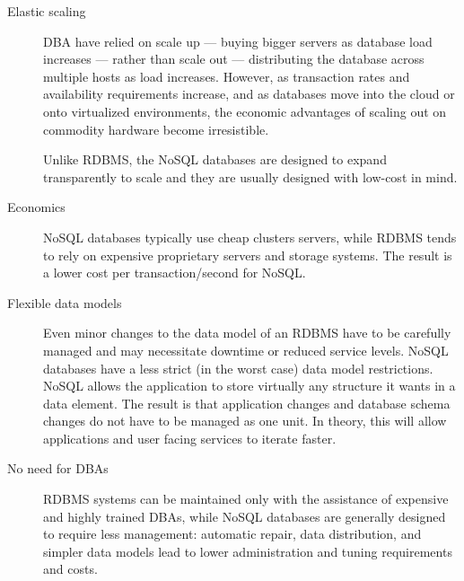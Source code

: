 \begin{description} %

\item[Elastic scaling] %

DBA have relied on scale up — buying bigger servers as database load increases — rather than scale out — distributing the database across multiple hosts as load increases. However, as transaction rates and availability requirements increase, and as databases move into the cloud or onto virtualized environments, the economic advantages of scaling out on commodity hardware become irresistible.

Unlike RDBMS, the NoSQL databases are designed to expand transparently to scale and they are usually designed with low-cost in mind.


\item[Economics] %

NoSQL databases typically use cheap clusters servers, while RDBMS tends to rely on expensive proprietary servers and storage systems. The result is a lower cost per transaction/second for NoSQL.


\item[Flexible data models] %

Even minor changes to the data model of an RDBMS have to be carefully managed and may necessitate downtime or reduced service levels. NoSQL databases have a less strict (in the worst case) data model restrictions. NoSQL allows the application to store virtually any structure it wants in a data element. The result is that application changes and database schema changes do not have to be managed as one unit. In theory, this will allow applications
and user facing services
to iterate faster.

\item[No need for DBAs] %


RDBMS systems can be maintained only with the assistance of expensive and highly trained DBAs, while NoSQL databases are generally designed to require less management:  automatic repair, data distribution, and simpler data models lead to lower administration and tuning requirements and costs.

\end{description} %


